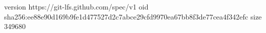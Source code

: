 version https://git-lfs.github.com/spec/v1
oid sha256:ee88e90d169b9fe1d477527d2c7abce29cfd9970ea67bb8f3de77cea4f342efc
size 349680
